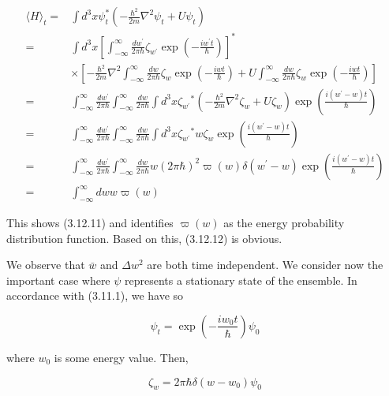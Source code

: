 \documentclass{article}
\begin{document}
\begin{align*}
\langle H\rangle_{t}= & \int d^{3} x \psi_{t}^{*}\left(-\frac{\hbar^{2}}{2 m} \nabla^{2} \psi_{t}+U \psi_{t}\right)  \tag{3.12.13}\\
= & \int d^{3} x\left[\int_{-\infty}^{\infty} \frac{d w^{\prime}}{2 \pi \hbar} \zeta_{w^{\prime}} \exp \left(-\frac{i w^{\prime} t}{\hbar}\right)\right]^{*} \\
& \times\left[-\frac{\hbar^{2}}{2 m} \nabla^{2} \int_{-\infty}^{\infty} \frac{d w}{2 \pi \hbar} \zeta_{w} \exp \left(-\frac{i w t}{\hbar}\right)+U \int_{-\infty}^{\infty} \frac{d w}{2 \pi \hbar} \zeta_{w} \exp \left(-\frac{i w t}{\hbar}\right)\right] \\
= & \int_{-\infty}^{\infty} \frac{d w^{\prime}}{2 \pi \hbar} \int_{-\infty}^{\infty} \frac{d w}{2 \pi \hbar} \int d^{3} x \zeta_{w^{\prime}}{ }^{*}\left(-\frac{\hbar^{2}}{2 m} \nabla^{2} \zeta_{w}+U \zeta_{w}\right) \exp \left(\frac{i\left(w^{\prime}-w\right) t}{\hbar}\right) \\
= & \int_{-\infty}^{\infty} \frac{d w^{\prime}}{2 \pi \hbar} \int_{-\infty}^{\infty} \frac{d w}{2 \pi \hbar} \int d^{3} x \zeta_{w^{\prime}}{ }^{*} w \zeta_{w} \exp \left(\frac{i\left(w^{\prime}-w\right) t}{\hbar}\right) \\
= & \int_{-\infty}^{\infty} \frac{d w^{\prime}}{2 \pi \hbar} \int_{-\infty}^{\infty} \frac{d w}{2 \pi \hbar} w(2 \pi \hbar)^{2} \varpi(w) \delta\left(w^{\prime}-w\right) \exp \left(\frac{i\left(w^{\prime}-w\right) t}{\hbar}\right) \\
= & \int_{-\infty}^{\infty} d w w \varpi(w)
\end{align*}
 

This shows (3.12.11) and identifies $\varpi(w)$ as the energy probability distribution function. Based on this, (3.12.12) is obvious.

We observe that $\bar{w}$ and $\Delta w^{2}$ are both time independent.
We consider now the important case where $\psi$ represents a stationary state of the ensemble. In accordance with (3.11.1), we have so
 
\begin{equation*}
\psi_{t}=\exp \left(-\frac{i w_{0} t}{\hbar}\right) \psi_{0} \tag{3.12.14}
\end{equation*}
 
where $w_{0}$ is some energy value. Then,
 
\begin{equation*}
\zeta_{w}=2 \pi \hbar \delta\left(w-w_{0}\right) \psi_{0} \tag{3.12.15}
\end{equation*}
 
\end{document}
